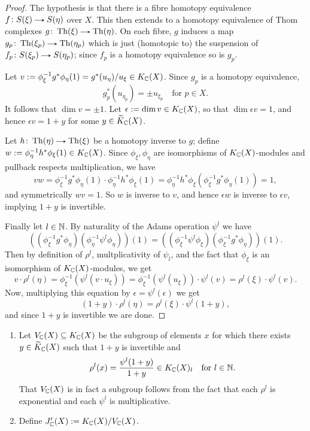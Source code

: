 \begin{proof}
  The hypothesis is that there is a fibre homotopy equivalence
  $f \c S(\xi) \to S(\eta)$ over $X$. This then extends to a homotopy
  equivalence of Thom complexes $g \c \Th(\xi) \to \Th(\eta)$. On each
  fibre, $g$ induces a map $g_p \c \Th(\xi_p) \to \Th(\eta_p)$ which
  is just (homotopic to) the suspension of
  $f_p \c S(\xi_p) \to S(\eta_p)$; since $f_p$ is a homotopy
  equivalence so is $g_p$.

  Let $v \mathrel{:=} \phi_\xi^{-1}g^*\phi_\eta(1) = g^*(u_\eta)/u_\xi \in
  K_{\mathbb{C}}(X)$. Since $g_p$ is a homotopy equivalence,
  \[
  g_p^*(u_{\eta_p}) = \pm u_{\xi_p} \quad \text{for }p \in X.
  \]
  It follows that $\dim v = \pm 1$. Let $\epsilon \mathrel{:=} \dim v \in
  K_{\mathbb{C}}(X)$, so that $\dim \epsilon v = 1$, and hence $\epsilon v = 1
  + y$ for some $y \in \widetilde K_{\mathbb{C}}(X)$.

  Let $h \c \Th(\eta) \to \Th(\xi)$ be a homotopy inverse to $g$;
  define $w \mathrel{:=} \phi_\eta^{-1}h^*\phi_\xi(1) \in K_{\mathbb{C}}(X)$. Since
  $\phi_\xi,\phi_\eta$ are isomorphisms of $K_{\mathbb{C}}(X)$-modules and
  pullback respects multiplication, we have
  \[
  vw = \phi_\xi^{-1}g^*\phi_\eta(1) \cdot
  \phi_\eta^{-1}h^*\phi_\xi(1) =
  \phi_\eta^{-1}h^*\phi_\xi(\phi_\xi^{-1}g^*\phi_\eta(1)) = 1,
  \]
  and symmetrically $wv = 1$. So $w$ is inverse to $v$, and hence
  $\epsilon w$ is inverse to $\epsilon v$, implying $1+y$ is
  invertible.

  Finally let $l \in \mathbb{N}$. By naturality of the Adams operation
  $\psi^l$ we have
  \[
  ((\phi_\xi^{-1}g^*\phi_\eta)(\phi_\eta^{-1}\psi^l\phi_\eta))(1) =
  ((\phi_\xi^{-1}\psi^l\phi_\xi)(\phi_\xi^{-1}g^*\phi_\eta))(1).
  \]
  Then by definition of $\rho^l$, multplicativity of $\psi_l$, and the
  fact that $\phi_\xi$ is an isomorphism of $K_{\mathbb{C}}(X)$-modules, we get
  \[
  v \cdot \rho^l(\eta) = \phi_\xi^{-1}(\psi^l(v \cdot u_\xi)) =
  \phi_\xi^{-1}(\psi^l(u_\xi)) \cdot \psi^l(v) = \rho^l(\xi) \cdot
  \psi^l(v).
  \]
  Now, multiplying this equation by $\epsilon = \psi^l(\epsilon)$ we
  get
  \[
  (1+y) \cdot \rho^l(\eta) = \rho^l(\xi) \cdot \psi^l(1+y),
  \]
  and since $1+y$ is invertible we are done.
\end{proof}

\begin{definitions}
  \label{jprime}
  \begin{enumerate}[leftmargin=*]
  \item Let $V_{\mathbb{C}}(X) \subseteq K_{\mathbb{C}}(X)$ be the subgroup of elements
    $x$ for which there exists $y \in \widetilde K_{\mathbb{C}}(X)$ such that $1+y$ is
    invertible and
    \begin{equation}
      \label{jprime-y}
      \rho^l(x) = \frac{\psi^l(1+y)}{1+y} \in K_{\mathbb{C}}(X)_l \quad \text{for
      } l \in \mathbb{N}.
    \end{equation}
    That $V_{\mathbb{C}}(X)$ is in fact a subgroup
    follows from the fact that each $\rho^l$ is exponential and each
    $\psi^l$ is multiplicative.
  \item Define $J_{\mathbb{C}}'(X) \mathrel{:=} K_{\mathbb{C}}(X)/V_{\mathbb{C}}(X)$.
  \end{enumerate}
\end{definitions}

